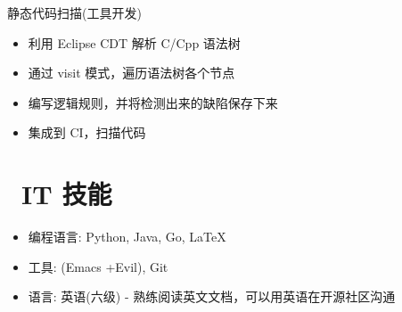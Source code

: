 \documentclass{resume}
\begin{document}
\begin{onehalfspacing}
静态代码扫描(工具开发)
\begin{itemize}
  \item 利用 Eclipse CDT 解析 C/Cpp 语法树
  \item 通过 visit 模式，遍历语法树各个节点
  \item 编写逻辑规则，并将检测出来的缺陷保存下来
  \item 集成到 CI，扫描代码
\end{itemize}
\end{onehalfspacing}


\section{\faCogs\ IT 技能}
\begin{itemize}[parsep=0.5ex]
  \item 编程语言: Python, Java, Go, \LaTeX
  \item 工具: (Emacs +Evil), Git
  \item 语言: 英语(六级) - 熟练阅读英文文档，可以用英语在开源社区沟通
\end{itemize}



%
%
\end{document}
